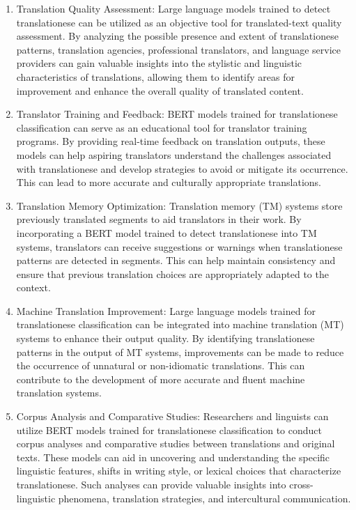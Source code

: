 \begin{enumerate}
    \item Translation Quality Assessment: Large language models trained to detect translationese can be utilized as an objective tool for translated-text quality assessment. By analyzing the possible presence and extent of translationese patterns, translation agencies, professional translators, and language service providers can gain valuable insights into the stylistic and linguistic characteristics of translations, allowing them to identify areas for improvement and enhance the overall quality of translated content.

    \item Translator Training and Feedback: BERT models trained for translationese classification can serve as an educational tool for translator training programs. By providing real-time feedback on translation outputs, these models can help aspiring translators understand the challenges associated with translationese and develop strategies to avoid or mitigate its occurrence. This can lead to more accurate and culturally appropriate translations.

    \item Translation Memory Optimization: Translation memory (TM) systems store previously translated segments to aid translators in their work. By incorporating a BERT model trained to detect translationese into TM systems, translators can receive suggestions or warnings when translationese patterns are detected in segments. This can help maintain consistency and ensure that previous translation choices are appropriately adapted to the context.

    \item Machine Translation Improvement: Large language models trained for translationese classification can be integrated into machine translation (MT) systems to enhance their output quality. By identifying translationese patterns in the output of MT systems, improvements can be made to reduce the occurrence of unnatural or non-idiomatic translations. This can contribute to the development of more accurate and fluent machine translation systems.

    \item Corpus Analysis and Comparative Studies: Researchers and linguists can utilize BERT models trained for translationese classification to conduct corpus analyses and comparative studies between translations and original texts. These models can aid in uncovering and understanding the specific linguistic features, shifts in writing style, or lexical choices that characterize translationese. Such analyses can provide valuable insights into cross-linguistic phenomena, translation strategies, and intercultural communication.


\end{enumerate}
